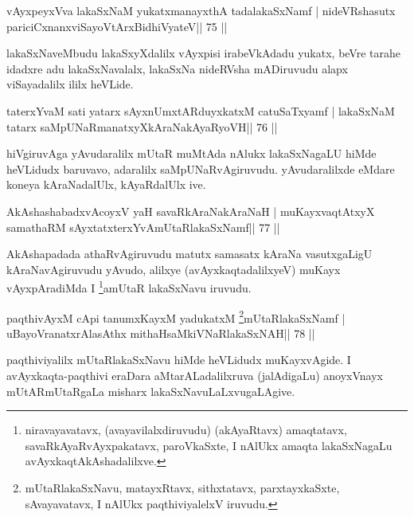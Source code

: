 \begin{shl}
vAyxpeyxVva lakaSxNaM yukatxmanayxthA tadalakaSxNamf |
nideVRshasutx pariciCxnanxviSayoV\s tArxBidhiVyateV\hfill || 75 ||
\end{shl}

\begin{artha}
lakaSxNaveMbudu lakaSxyXdalilx vAyxpisi irabeVkAdadu yukatx, beVre tarahe idadxre adu lakaSxNavalalx, lakaSxNa nideRVsha mADiruvudu alapx viSayadalilx ililx heVLide.
\end{artha}


\begin{shl}
taterxYvaM sati yatarx sAyxnUmxtARduyxkatxM catuSaTxyamf |
lakaSxNaM tatarx saMpUNaRmanatxyXkAraNakAyaRyoVH\hfill || 76 ||
\end{shl}

\begin{artha}
hiVgiruvAga yAvudaralilx mUtaR muMtAda nAlukx lakaSxNagaLU hiMde
heVLidudx baruvavo, adaralilx saMpUNaRvAgiruvudu. yAvudaralilxde
eMdare koneya kAraNadalUlx, kAyaRdalUlx ive. 
\end{artha}


\begin{shl}
AkAshashabadxvAcoyxV yaH savaRkAraNakAraNaH |
muKayxvaqtAtxyX samathaRM sAyxtatxterxYvAmUtaRlakaSxNamf\hfill || 77 ||
\end{shl}

\begin{artha}
AkAshapadada athaRvAgiruvudu matutx samasatx kAraNa vasutxgaLigU kAraNavAgiruvudu yAvudo, alilxye (avAyxkaqtadalilxyeV) muKayx vAyxpAradiMda I \footnote{niravayavatavx, (avayavilalxdiruvudu)   (akAyaRtavx) amaqtatavx, savaRkAyaRvAyxpakatavx, paroVkaSxte, I   nAlUkx amaqta lakaSxNagaLu avAyxkaqtAkAshadalilxve.}amUtaR lakaSxNavu iruvudu.
\end{artha}




\begin{shl}
paqthivAyxM cApi tanumxKayxM yadukatxM \footnote{mUtaRlakaSxNavu, matayxRtavx, sithxtatavx, parxtayxkaSxte, sAvayavatavx, I nAlUkx paqthiviyalelxV iruvudu.}mUtaRlakaSxNamf |
uBayoVranatxrAlasAthx mithaHsaMkiVNaRlakaSxNAH\hfill || 78 ||
\end{shl}

\begin{artha}
paqthiviyalilx mUtaRlakaSxNavu hiMde heVLidudx muKayxvAgide. I avAyxkaqta-paqthivi eraDara aMtarALadalilxruva (jalAdigaLu) anoyxVnayx mUtARmUtaRgaLa misharx lakaSxNavuLaLxvugaLAgive.
\end{artha}

